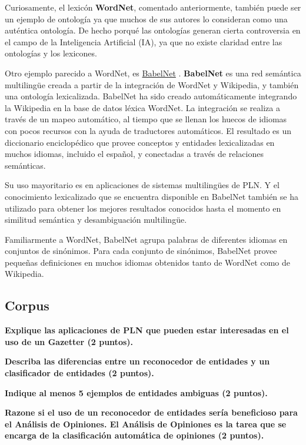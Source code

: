\documentclass[11pt]{exam}
\begin{document}
\begin{questions}
Curiosamente, el lexicón {\bf WordNet}, comentado anteriormente, también puede ser un ejemplo de ontología ya que muchos de sus autores lo consideran como una auténtica ontología. De hecho porqué las ontologías generan cierta controversia en el campo de la Inteligencia Artificial (IA), ya que no existe claridad entre las ontologías y los lexicones.

Otro ejemplo parecido a WordNet, es \href{https://babelnet.org/}{BabelNet} . {\bf BabelNet} es una red semántica multilingüe creada a partir de la integración de WordNet y Wikipedia, y también una ontología lexicalizada. BabelNet ha sido creado automáticamente integrando la Wikipedia en la base de datos léxica WordNet. La integración se realiza a través de un mapeo automático, al tiempo que se llenan los huecos de idiomas con pocos recursos con la ayuda de traductores automáticos. El resultado es un diccionario enciclopédico que provee conceptos y entidades lexicalizadas en muchos idiomas, incluido el español, y conectadas a través de relaciones semánticas. 

Su uso mayoritario es en aplicaciones de sistemas multilingües de PLN. Y el conocimiento lexicalizado que se encuentra disponible en BabelNet también se ha utilizado para obtener los mejores resultados conocidos hasta el momento en similitud semántica y desambiguación multilingüe.

Familiarmente a WordNet, BabelNet agrupa palabras de diferentes idiomas en conjuntos de sinónimos. Para cada conjunto de sinónimos, BabelNet provee pequeñas definiciones en muchos idiomas obtenidos tanto de WordNet como de Wikipedia.

\subsection*{Corpus}

{\bf \question Explique las aplicaciones de PLN que pueden estar interesadas en el uso de un Gazetter (2 puntos).}

{\bf \question Describa las diferencias entre un reconocedor de entidades y un clasificador de entidades (2 puntos).}

{\bf \question Indique al menos 5 ejemplos de entidades ambiguas (2 puntos).}

{\bf \question Razone si el uso de un reconocedor de entidades sería beneficioso para el Análisis de Opiniones. El Análisis de Opiniones es la tarea que se encarga de la clasificación automática de opiniones (2 puntos).}

\end{questions}
\end{document}
